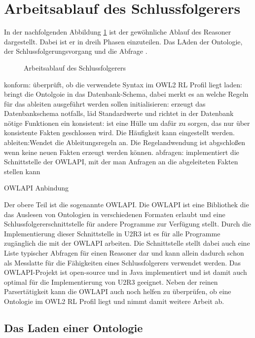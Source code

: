 \section{Arbeitsablauf des Schlussfolgerers}

In der nachfolgenden Abbildung \ref{image-u2r3-workflow} ist der gewöhnliche Ablauf des Reasoner dargestellt. Dabei ist er in dreih Phasen einzuteilen. Das LAden der Ontologie, der Schlussfolgerungsvorgang und die Abfrage .

\begin{figure}
	\caption{Arbeitsablauf des Schlussfolgerers}
	\label{image-u2r3-workflow}
\end{figure}

konform: überprüft, ob die verwendete Syntax im OWL2 RL Profil liegt
laden: bringt die Ontolgoie in das Datenbank-Schema, dabei merkt es an welche Regeln für das ableiten ausgeführt werden sollen
initialisieren: erzeugt das Datenbankschema notfalls, läd Standardwerte und richtet in der Datenbank nötige Funktionen ein
konsistent: ist eine Hülle um dafür zu sorgen, das nur über konsistente Fakten geschlossen wird. Die Häufigkeit kann eingestellt werden.
ableiten:Wendet die Ableitungsregeln an. Die Regelandwendung ist abgschloßen wenn keine neuen Fakten erzeugt werden können.
abfragen: implementiert die Schnittstelle der OWLAPI, mit der man Anfragen an die abgeleiteten Fakten stellen kann

OWLAPI Anbindung

Der obere Teil ist die sogenannte OWLAPI. Die OWLAPI ist eine Bibliothek die das Auslesen von Ontologien in verschiedenen Formaten erlaubt und eine Schlussfolgererschnittstelle für andere Programme zur Verfügung stellt. Durch die Implementierung dieser Schnittstelle in U2R3 ist es für alle Programme zugänglich die mit der OWLAPI arbeiten.
Die Schnittstelle stellt dabei auch eine Liste typischer Abfragen für einen Reasoner dar und kann allein dadurch schon als Messlatte für die Fähigkeiten eines Schlussfolgerers verwendet werden. Das OWLAPI-Projekt ist open-source und in Java implementiert und ist damit auch optimal für die Implementierung von U2R3 geeignet. Neben der reinen Parsertätigkeit kann die OWLAPI auch noch helfen zu überprüfen, ob eine Ontologie im OWL2 RL Profil liegt und nimmt damit weitere Arbeit ab.

\subsection{Das Laden einer Ontologie}

